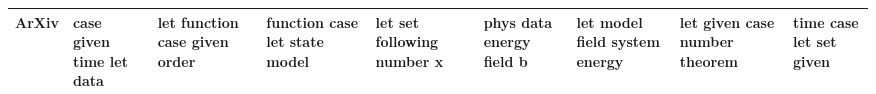 \documentclass[11pt,a4paper]{article}
\begin{document}
\begin{appendices}
\begin{table}[htp]
\begin{tiny}
\begin{tabular}{|p{}|p{}|p{}|p{}|p{}|p{}|p{}|p{}|p{}|}
ArXiv & case \newline given \newline time \newline let \newline data & let \newline function \newline case \newline given \newline order & function \newline case \newline let \newline state \newline model & let \newline set \newline following \newline number \newline x & phys \newline data \newline energy \newline field \newline b & let \newline model \newline field \newline system \newline energy & let \newline given \newline case \newline number \newline theorem & time \newline case \newline let \newline set \newline given\\\hline

\end{tabular}
\end{tiny}
\end{table}
\end{appendices}
\end{document}
